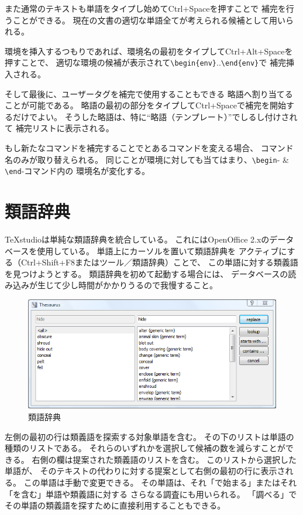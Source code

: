 また通常のテキストも単語をタイプし始めてCtrl+Spaceを押すことで
補完を行うことができる。
現在の文書の適切な単語全てが考えられる候補として用いられる。

環境を挿入するつもりであれば、環境名の最初をタイプしてCtrl+Alt+Spaceを押すことで、
適切な環境の候補が表示されて\verb+\begin{env}+..\verb+\end{env}+で
補完挿入される。

そして最後に、ユーザータグを補完で使用することもできる
略語へ割り当てることが可能である。
略語の最初の部分をタイプしてCtrl+Spaceで補完を開始するだけでよい。
そうした略語は、特に``略語（テンプレート）''でしるし付けされて
補完リストに表示される。

もし新たなコマンドを補完することでとあるコマンドを変える場合、
コマンド名のみが取り替えられる。
同じことが環境に対しても当てはまり、\verb+\begin+- \& \verb+\end+-コマンド内の
環境名が変化する。

\section{類語辞典}

TeXstudioは単純な類語辞典を統合している。
これにはOpenOffice 2.xのデータベースを使用している。
単語上にカーソルを置いて類語辞典を
アクティブにする（Ctrl+Shift+F8またはツール／類語辞典）ことで、
この単語に対する類義語を見つけようとする。
類語辞典を初めて起動する場合には、
データベースの読み込みが生じて少し時間がかかりうるので我慢すること。

\begin{figure}[H]
  \centering
  \includegraphics[width=.8\linewidth]{thesaurus.png}
  \caption{類語辞典}
\end{figure}

左側の最初の行は類義語を探索する対象単語を含む。
その下のリストは単語の種類のリストである。
それらのいずれかを選択して候補の数を減らすことができる。
右側の欄は提案された類義語のリストを含む。
このリストから選択した単語が、
そのテキストの代わりに対する提案として右側の最初の行に表示される。
この単語は手動で変更できる。
その単語は、それ「で始まる」またはそれ「を含む」単語や類義語に対する
さらなる調査にも用いられる。
「調べる」でその単語の類義語を探すために直接利用することもできる。

